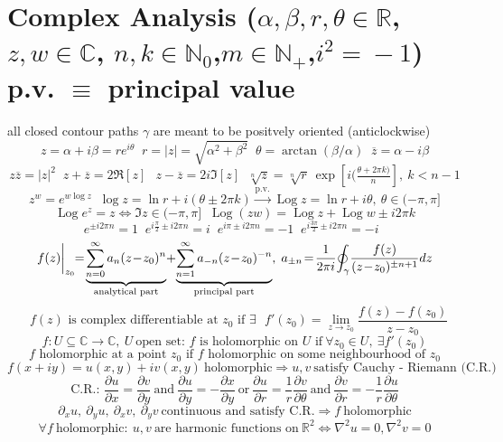 \section*{Complex Analysis \normalfont\scriptsize{($\alpha,\beta,r,\theta\!\in\!\mathbb{R}$, $z,w\!\in\!\mathbb{C}$, $n,k\!\in\!\mathbb{N}_0$,$m\!\in\! \mathbb{N}_+$,\;$i^2\!=\!-1$) \;\!\! p.v. \!$\equiv$ \! principal value}}
\normalfont\scriptsize{ all closed contour paths $\gamma$ are meant to be positvely oriented (anticlockwise)}
\[
z = \alpha + i \beta = r e^{i\theta} \;\; r = |z| = \sqrt{\alpha^2 +\beta ^2} \;\;
\theta = \arctan(\beta/\alpha) \;\;
\overline{z} = \alpha - i \beta \]
\[
z \overline{z} = |z|^2 \;\;
z + \overline{z} = 2 \Re[z] \;\;\, z - \overline{z} = 2i \Im[z]  \;\;
\sqrt[n]{z} =  \sqrt[n]{r} \ \operatorname{exp}[i(\tfrac{\theta+2\pi k)}{n}], \ k < n-1
\]
\[
z^w = e^{w \log z} \;\;
\log z  = \ln r + i (\theta \pm 2\pi k) \xrightarrow{\operatorname{p.v.}} \operatorname{Log} z = \ln r + i \theta, \ \theta \in (-\pi, \pi]
\]
\[
\operatorname{Log}e^z = z \Leftrightarrow \Im z \in (-\pi , \pi] \;\; \operatorname{Log}(zw) = \operatorname{Log} z + \operatorname{Log} w \pm i 2\pi k 
\]
\[
e^{\pm i 2\pi n} = 1 \;\;
e^{i \frac{\pi}{2} \pm i 2\pi n} = i \;\;
e^{i \pi \pm i 2\pi n} = -1 \;\;
e^{i \frac{3\pi}{2} \pm i 2\pi n} = -i \;\;
\] 
\[
f(z)\bigg|_{z_0}\!\!=\!\underbrace{\sum_{n=0}^\infty a_n(z\!-\!z_0)^n}_{\text{\scriptsize analytical part}}\!+\!\underbrace{\sum_{n=1}^\infty a_{-n}(z\!-\!z_0)^{-n}}_{\text{\scriptsize principal part}},\;
a_{\pm n}\!=\!\frac{1}{2\pi i}\!\oint_\gamma\!\frac{f(z)}{(z\!-\!z_0)^{\pm n+1}}dz
\]
\[
\text{ $f(z)$ is complex differentiable at $z_0$ if $\exists$\ }   f'(z_0) = \lim_{z \to z_0} \frac{f(z) - f(z_0)}{z - z_0}
\]
\[
f: U\subseteq \mathbb{C} \rightarrow \mathbb{C},\ U \ \text{open set: $f$ is holomorphic on $U$ if} \ \forall z_0 \in U, \ \exists f'(z_0)
\]
\[
\text{$f$ holomorphic at a point $z_0$ if $f$ holomorphic on some neighbourhood of $z_0$}
\]
\[
 f(x+iy) = u(x,y) + iv(x,y) \ \text{holomorphic} \Rightarrow u, v \ \text{satisfy Cauchy - Riemann (C.R.)}
\]
\[
\text{C.R.: } \frac{\partial u}{\partial x}  = \frac{\partial v}{\partial y} \ \text{and} \  \frac{\partial u}{\partial y}  = -\frac{\partial x}{\partial y} \ \text{or} \ \frac{\partial u}{\partial r}  = \frac{1}{r} \frac{\partial v}{\partial \theta} \ \text{and} \  \frac{\partial v}{\partial r}  = -\frac{1}{r} \frac{\partial u}{\partial \theta}
\]
\[
\partial_x u, \ \partial_y u, \ \partial_x v, \ \partial_y v \ \text{continuous and satisfy C.R.} \Rightarrow  f \ \text{holomorphic}
\]
\[ \forall  f \ \text{holomorphic}: \ u, v  \ \text{are harmonic functions on} \ \mathbb{R}^2 \Leftrightarrow\nabla ^2 u =0, \nabla ^2 v =0
\]
